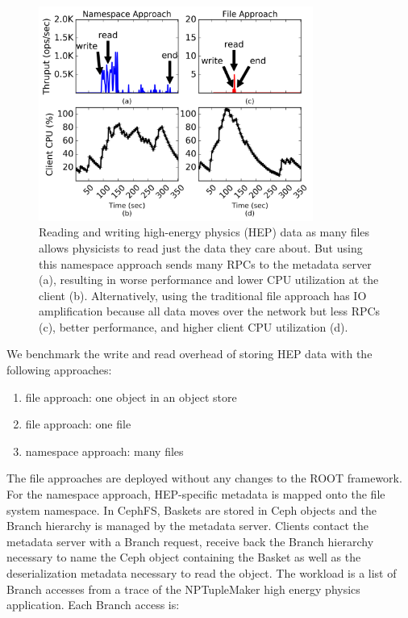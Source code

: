 \begin{figure}[t]
  \centering
  \includegraphics[width=90mm]{figures/hep_problem.png}
  \caption{Reading and writing high-energy physics (HEP) data as many files
allows physicists to read just the data they care about. But using this
namespace approach sends many RPCs to the metadata server (a), resulting in
worse performance and lower CPU utilization at the client (b). Alternatively,
using the traditional file approach has IO amplification because all data moves
over the network but less RPCs (c), better performance, and higher client CPU
utilization (d).}
  \label{fig:hep_problem}
\end{figure}

We benchmark the write and read overhead of storing HEP data with the following
approaches:

\begin{enumerate}
  \item file approach: one object in an object store
  \item file approach: one file
  \item namespace approach: many files
\end{enumerate}

The file approaches are deployed without any changes to the ROOT framework. For
the namespace approach, HEP-specific metadata is mapped onto the file system
namespace. In CephFS, Baskets are stored in Ceph objects and the Branch
hierarchy is managed by the metadata server.  Clients contact the metadata
server with a Branch request, receive back the Branch hierarchy necessary to
name the Ceph object containing the Basket as well as the deserialization
metadata necessary to read the object.  The workload is a list of Branch
accesses from a trace of the NPTupleMaker high energy physics application. Each
Branch access is:

